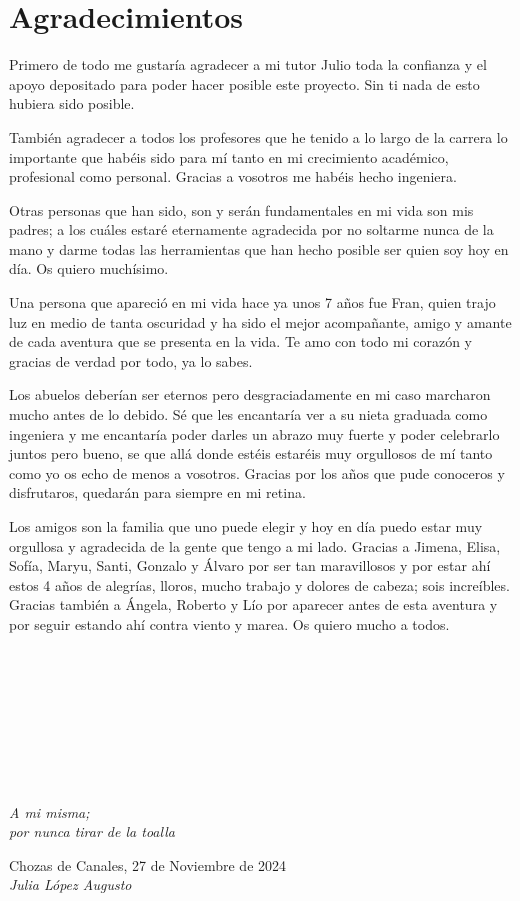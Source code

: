 \cleardoublepage

\chapter*{Agradecimientos}

Primero de todo me gustaría agradecer a mi tutor Julio toda la confianza y el apoyo depositado para poder hacer posible este proyecto. Sin ti nada de esto hubiera sido posible.

También agradecer a todos los profesores que he tenido a lo largo de la carrera lo importante que habéis sido para mí tanto en mi crecimiento académico, profesional como personal. Gracias a vosotros me habéis hecho ingeniera.

Otras personas que han sido, son y serán fundamentales en mi vida son mis padres; a los cuáles estaré eternamente agradecida por no soltarme nunca de la mano y darme todas las herramientas que han hecho posible ser quien soy hoy en día. Os quiero muchísimo.

Una persona que apareció en mi vida hace ya unos 7 años fue Fran, quien trajo luz en medio de tanta oscuridad y ha sido el mejor acompañante, amigo y amante de cada aventura que se presenta en la vida. Te amo con todo mi corazón y gracias de verdad por todo, ya lo sabes.

Los abuelos deberían ser eternos pero desgraciadamente en mi caso marcharon mucho antes de lo debido. Sé que les encantaría ver a su nieta graduada como ingeniera y me encantaría poder darles un abrazo muy fuerte y poder celebrarlo juntos pero bueno, se que allá donde estéis estaréis muy orgullosos de mí tanto como yo os echo de menos a vosotros. Gracias por los años que pude conoceros y disfrutaros, quedarán para siempre en mi retina. 

Los amigos son la familia que uno puede elegir y hoy en día puedo estar muy orgullosa y agradecida de la gente que tengo a mi lado. Gracias a Jimena, Elisa, Sofía, Maryu, Santi, Gonzalo y Álvaro por ser tan maravillosos y por estar ahí estos 4 años de alegrías, lloros, mucho trabajo y dolores de cabeza; sois increíbles. Gracias también a Ángela, Roberto y Lío por aparecer antes de esta aventura y por seguir estando ahí contra viento y marea. Os quiero mucho a todos. \\
\ %

\

\

\

\

\begin{flushright}
		\vspace{4.0 cm}
		\emph{A mi misma;\\
      por nunca tirar de la toalla}\\
		\par
		\vspace{1.0 cm}
		Chozas de Canales, 27 de Noviembre de 2024\\ %
		\emph{Julia López Augusto}
\end{flushright}

\thispagestyle{empty}


